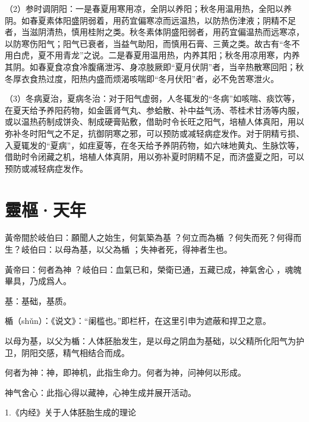 \documentclass[draft,12pt]{ctexbook}
\begin{document}
（2）参时调阴阳：一是春夏用寒用凉，全阴以养阳；秋冬用温用热，全阳以养阴。如春夏素体阳盛阴弱着，用药宜偏寒凉而远温热，以防热伤津液；阴精不足者，当滋阴清热，慎用桂附之类。秋冬素体阴盛阳弱者，用药宜偏温热而远寒凉，以防寒伤阳气；阳气已衰者，当益气助阳，而慎用石膏、三黄之类。故古有“冬不用白虎，夏不用青龙”之说。二是春夏用温用热，内养其阳；秋冬用凉用寒，内养其阴。如春夏食凉食冷腹痛泄泻、身凉肢厥即“夏月伏阴”者，当辛热散寒回阳；秋冬厚衣食热过度，阳热内盛而烦渴咳喘即“冬月伏阳”者，必不免苦寒泄火。

（3）冬病夏治，夏病冬治：对于阳气虚弱，人冬辄发的“冬病”如咳喘、痰饮等，在夏天给予养阳药物，如金匮肾气丸、参蛤散、补中益气汤、苓桂术甘汤等内服，或以温热药制成饼灸、制成硬膏贴敷，借助时令长旺之阳气，培植人体真阳，用以弥补冬时阳气之不足，抗御阴寒之邪，可以预防或减轻病症发作。对于阴精亏损、入夏辄发的“夏病”，如疰夏等，在冬天给予养阴药物，如六味地黄丸、生脉饮等，借助时令闭藏之机，培植人体真阴，用以弥补夏时阴精不足，而济盛夏之阳，可以预防或减轻病症发作。

\section{靈樞·天年}%


\begin{yuanwen}
黃帝間於岐伯曰：願聞人之始生，何氣築為基 ？何立而為楯 ？何失而死？何得而生？岐伯曰：以母為基，以父為楯 ；失神者死，得神者生也。

黃帝曰：何者為神 ？岐伯曰：血氣已和，榮衛已通，五藏已成，神氣舍心 ，魂魄畢具，乃成爲人。
\end{yuanwen}


\begin{jiaozhu}
	\item 基：基础，基质。
	\item 楯（shǔn）：《说文》：“阑槛也。”即栏杆，在这里引申为遮蔽和捍卫之意。
	\item 以母为基，以父为楯：人体胚胎发生，是以母之阴血为基础，以父精所化阳气为护卫，阴阳交感，精气相结合而成。
	\item 何者为神：神，即神机，此指生命力。何者为神，问神何以形成。
	\item 神气舍心：此指心得以藏神，心神生成并展开活动。
\end{jiaozhu}


1.《内经》关于人体胚胎生成的理论
\end{document}
